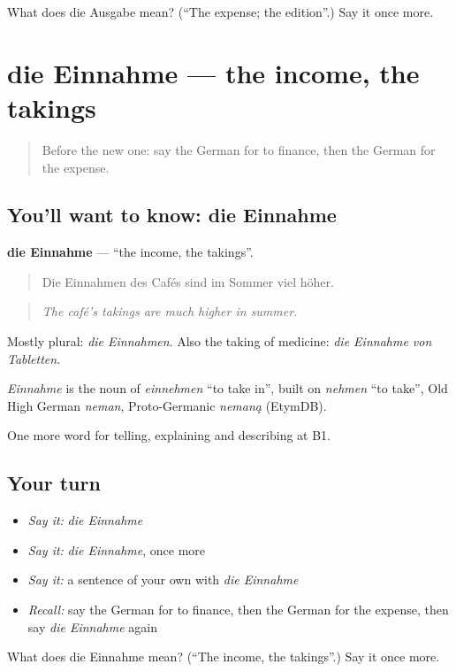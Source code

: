 \begin{tcolorbox}[breakable,colback=teal!4,colframe=teal!35!black,title={Before you move on}]
What does die Ausgabe mean? (\textquotedblleft{}The expense; the edition\textquotedblright{}.) Say it once more.
\end{tcolorbox}
\section[die Einnahme]{die Einnahme — the income, the takings}

\label{lesson:GE-C389-einnahme}



\begin{quote}
Before the new one: say the German for to finance, then the German for the expense.
\end{quote}

\subsection*{You'll want to know: die Einnahme}
\textbf{die Einnahme} — \textquotedblleft{}the income, the takings\textquotedblright{}.

\begin{quote}
Die Einnahmen des Cafés sind im Sommer viel höher.
\end{quote}

\begin{quote}
\emph{The café's takings are much higher in summer.}
\end{quote}

Mostly plural: \emph{die Einnahmen}. Also the taking of medicine: \emph{die Einnahme von Tabletten}.

\begin{cousinweb}
\emph{Einnahme} is the noun of \emph{einnehmen} \textquotedblleft{}to take in\textquotedblright{}, built on \emph{nehmen} \textquotedblleft{}to take\textquotedblright{}, Old High German \emph{neman}, Proto-Germanic \emph{nemaną} (EtymDB).
\end{cousinweb}

\begin{grammarlens}[title={What you've built}]
One more word for telling, explaining and describing at B1.
\end{grammarlens}

\subsection*{Your turn}
\begin{itemize}
\raggedright
  \item \emph{Say it:} \emph{die Einnahme}
  \item \emph{Say it:} \emph{die Einnahme}, once more
  \item \emph{Say it:} a sentence of your own with \emph{die Einnahme}
  \item \emph{Recall:} say the German for to finance, then the German for the expense, then say \emph{die Einnahme} again
\end{itemize}

\begin{tcolorbox}[breakable,colback=teal!4,colframe=teal!35!black,title={Before you move on}]
What does die Einnahme mean? (\textquotedblleft{}The income, the takings\textquotedblright{}.) Say it once more.
\end{tcolorbox}

